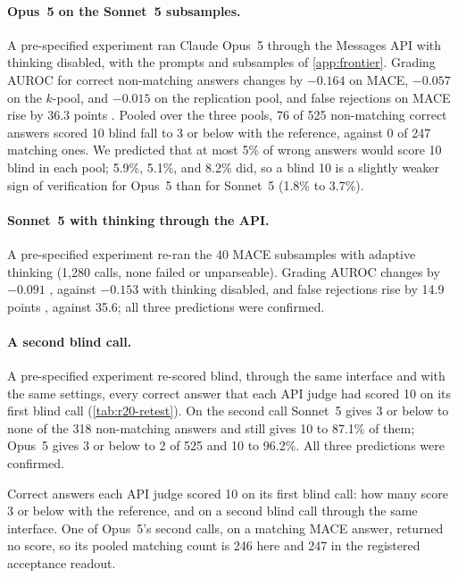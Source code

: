 \paragraph{Opus~5 on the Sonnet~5 subsamples.}
A pre-specified experiment ran Claude Opus~5 through the Messages API with thinking disabled, with the prompts and subsamples of \cref{app:frontier}. Grading AUROC for correct non-matching answers changes by $-0.164$  on \textsc{MACE}, $-0.057$ on the $k$-pool, and $-0.015$  on the replication pool, and false rejections on \textsc{MACE} rise by 36.3 points . Pooled over the three pools, 76 of 525 non-matching correct answers scored 10 blind fall to 3 or below with the reference, against 0 of 247 matching ones. We predicted that at most 5\% of wrong answers would score 10 blind in each pool; 5.9\%, 5.1\%, and 8.2\% did, so a blind 10 is a slightly weaker sign of verification for Opus~5 than for Sonnet~5 (1.8\% to 3.7\%).

\paragraph{Sonnet~5 with thinking through the API.}
A pre-specified experiment re-ran the 40 \textsc{MACE} subsamples with adaptive thinking (1,280 calls, none failed or unparseable). Grading AUROC changes by $-0.091$ , against $-0.153$ with thinking disabled, and false rejections rise by 14.9 points , against 35.6; all three predictions were confirmed.

\paragraph{A second blind call.}
A pre-specified experiment re-scored blind, through the same interface and with the same settings, every correct answer that each API judge had scored 10 on its first blind call (\cref{tab:r20-retest}). On the second call Sonnet~5 gives 3 or below to none of the 318 non-matching answers and still gives 10 to 87.1\% of them; Opus~5 gives 3 or below to 2 of 525 and 10 to 96.2\%. All three predictions were confirmed.

\begin{table}[htbp]
\centering
\caption{Correct answers each API judge scored 10 on its first blind call: how many score 3 or below with the reference, and on a second blind call through the same interface. One of Opus~5's second calls, on a matching \textsc{MACE} answer, returned no score, so its pooled matching count is 246 here and 247 in the registered acceptance readout.\pre}
\label{tab:r20-retest}
\footnotesize
\begin{adjustbox}{max width=\linewidth}\end{adjustbox}
\end{table}

